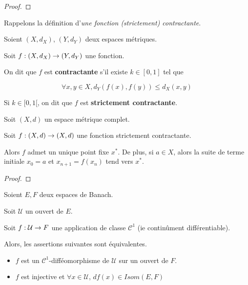 \ifdefined\outputproof
\begin{proof}

\end{proof}
\fi

Rappelons la définition d'\textit{une fonction (strictement) contractante}.

\begin{definition}
	Soient $(X, d_{X})$, $(Y, d_{Y})$ deux espaces métriques.

	Soit $f : (X, d_{X}) \rightarrow (Y, d_{Y})$ une fonction.

	On dit que $f$ est \textbf{contractante} s'il existe $k \in [0, 1]$ tel que

	\begin{equation*}
		\forall x, y \in X, d_{Y}(f(x), f(y)) \leq d_{X}(x, y)
	\end{equation*}

	Si $k \in [0, 1[$, on dit que $f$  est \textbf{strictement contractante}.
\end{definition}

\begin{theorem} 
	\label{theorem:point_fixe_banach}
	Soit $(X, d)$ un espace métrique complet.

	Soit $f : (X, d) \rightarrow (X, d)$ une fonction strictement contractante.

	Alors $f$ admet un unique point fixe $x^{*}$.
	De plus, si $a \in X$, alors la suite de terme initiale $x_{0} = a$ et $x_{n
	+ 1} = f(x_{n})$ tend vers $x^{*}$.
\end{theorem}

\ifdefined\outputproof
\begin{proof}

\end{proof}
\fi


\begin{theorem}
	\label{theorem:inversion_globale}
	Soient $E, F$ deux espaces de Banach.

	Soit $\mathcal{U}$ un ouvert de $E$.

	Soit $f : \mathcal{U} \rightarrow F$ une application de classe
	$\mathcal{C}^{1}$ (ie continûment différentiable).

	Alors, les assertions suivantes sont équivalentes.

	\begin{itemize}
		\item $f$ est un $\mathcal{C}^{1}$-difféomorphisme de $\mathcal{U}$ sur
			un ouvert de $F$.
		\item $f$ est injective et $\forall x \in \mathcal{U}$, $df(x) \in
			Isom(E, F)$
	\end{itemize}
\end{theorem}

